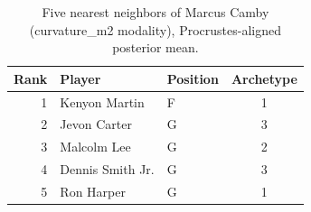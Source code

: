 \begin{table}[htbp]
  \centering\small
  \begin{tabular}{rllc}
    \toprule
    Rank & Player & Position & Archetype \\
    \midrule
    1 & Kenyon Martin & F & 1 \\
    2 & Jevon Carter & G & 3 \\
    3 & Malcolm Lee & G & 2 \\
    4 & Dennis Smith Jr. & G & 3 \\
    5 & Ron Harper & G & 1 \\
    \bottomrule
  \end{tabular}
  \caption{Five nearest neighbors of Marcus Camby (curvature_m2 modality), Procrustes-aligned posterior mean.}
  \label{tab:Marcus_Camby_neighbors_curvature_m2}
\end{table}

